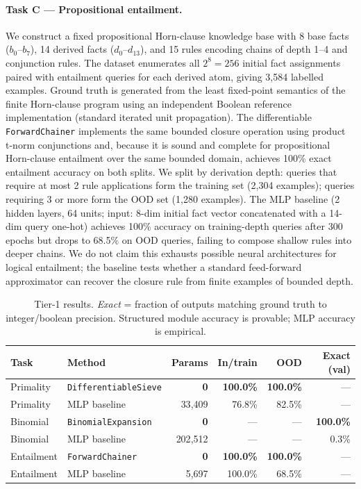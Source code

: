 \documentclass{article}
\begin{document}
\paragraph{Task C --- Propositional entailment.}
We construct a fixed propositional Horn-clause knowledge base with 8 base facts
($b_0$--$b_7$), 14 derived facts ($d_0$--$d_{13}$), and 15 rules encoding chains of
depth 1--4 and conjunction rules.
The dataset enumerates all $2^8 = 256$ initial fact assignments paired with entailment
queries for each derived atom, giving 3{,}584 labelled examples.
Ground truth is generated from the least fixed-point semantics of the finite
Horn-clause program using an independent Boolean reference implementation (standard
iterated unit propagation).
The differentiable \texttt{ForwardChainer} implements the same bounded closure
operation using product t-norm conjunctions and, because it is sound and complete for
propositional Horn-clause entailment over the same bounded domain, achieves 100\%
exact entailment accuracy on both splits.
We split by derivation depth: queries that require at most 2 rule applications form the
training set (2{,}304 examples); queries requiring 3 or more form the OOD set
(1{,}280 examples).
The MLP baseline (2 hidden layers, 64 units; input: 8-dim initial fact vector concatenated
with a 14-dim query one-hot) achieves 100\% accuracy on training-depth queries after 300
epochs but drops to 68.5\% on OOD queries, failing to compose shallow rules into deeper
chains. We do not claim this exhausts possible neural architectures for logical entailment;
the baseline tests whether a standard feed-forward approximator can recover the closure
rule from finite examples of bounded depth.

\begin{table}[t]
  \centering
  \caption{Tier-1 results. \emph{Exact} = fraction of outputs matching ground truth
    to integer/boolean precision. Structured module accuracy is provable; MLP accuracy
    is empirical.}
  \label{tab:tier1}
  \small
  \begin{tabular}{llrrrr}
    \toprule
    Task & Method & Params & In/train & OOD & Exact (val) \\
    \midrule
    Primality    & \texttt{DifferentiableSieve} & \textbf{0} & \textbf{100.0\%} & \textbf{100.0\%} & --- \\
    Primality    & MLP baseline                 & 33{,}409   & 76.8\%           & 82.5\%           & --- \\
    \midrule
    Binomial     & \texttt{BinomialExpansion}   & \textbf{0} & ---              & ---              & \textbf{100.0\%} \\
    Binomial     & MLP baseline                 & 202{,}512  & ---              & ---              & 0.3\%  \\
    \midrule
    Entailment   & \texttt{ForwardChainer}      & \textbf{0} & \textbf{100.0\%} & \textbf{100.0\%} & --- \\
    Entailment   & MLP baseline                 & 5{,}697    & 100.0\%          & 68.5\%           & --- \\
    \bottomrule
  \end{tabular}
\end{table}
\end{document}
